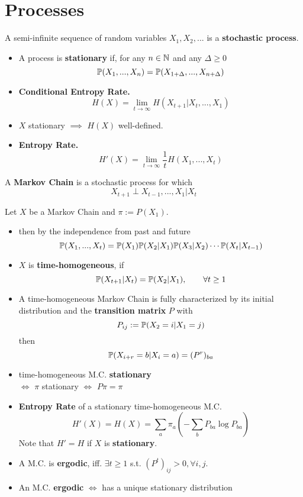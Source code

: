 \section{Processes}

A semi-infinite sequence of random variables \(X_1, X_2, ... \) is a \textbf{stochastic process}.

\begin{itemize}[label=-]
    \item A process is \textbf{stationary} if, for any \(n \in \N\) and any \(\Delta \geq 0\) 
    \[\P(X_1, ..., X_n) = \P(X_{1+\Delta}, ..., X_{n+\Delta})\] 
    \item \textbf{Conditional Entropy Rate.} 
    \[H(X) = \lim_{t \to \infty} H(X_{t+1} | X_t, ..., X_1)\]
    \item \(X\) stationary \(\implies\) \(H(X)\) well-defined.
    \item \textbf{Entropy Rate.} \[H'(X) = \lim_{t \to \infty} \frac{1}{t}H(X_1, ..., X_t)\] 
\end{itemize}

A \textbf{Markov Chain} is a stochastic process for which 
\[X_{t+1} \perp X_{t-1}, ..., X_1 | X_t\]

Let \(X\) be a Markov Chain and \(\pi := P(X_1)\).
\begin{itemize}[label=-]
    \item then by the independence from past and future
    \[\P(X_1, ..., X_t) = \P(X_1)\P(X_2|X_1)\P(X_3|X_2)\cdots \P(X_t | X_{t-1})\]
    \item \(X\) is \textbf{time-homogeneous}, if \[\P(X_{t+1}|X_t) = \P(X_2|X_1), \qquad \forall t \geq 1\]
    \item A time-homogeneous Markov Chain is fully characterized by its initial distribution and the \textbf{transition matrix} \(P\) with 
    \[P_{ij} := \P(X_2 = i | X_1 = j)\] 
    then \[\P(X_{i+r} = b | X_i = a) = (P^r)_{ba}\]
    \item time-homogeneous M.C. \textbf{stationary} \\\(\iff\) \(\pi\) stationary \(\iff\) \(P \pi = \pi\)
    \item\textbf{Entropy Rate} of a stationary time-homogeneous M.C. 
    \[H'(X) = H(X) = \sum_{a}\pi_a \left(- \sum_{b}P_{ba} \log P_{ba}\right)\]
    Note that \(H' = H\) if \(X\) is \textbf{stationary}.
    \item A M.C. is \textbf{ergodic}, iff. \(\exists t \geq 1\) s.t. \((P^t)_{ij} > 0, \forall i, j.\)
    \item An M.C. \textbf{ergodic} \(\iff\) has a unique stationary distribution
\end{itemize}

